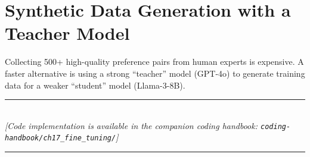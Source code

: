 \section{Synthetic Data Generation with a Teacher Model}

Collecting 500+ high-quality preference pairs from human experts is expensive. A faster alternative is using a strong ``teacher'' model (GPT-4o) to generate training data for a weaker ``student'' model (Llama-3-8B).


\begin{center}
\noindent\rule{0.6\textwidth}{0.4pt} \\
\vspace{0.3em}
\textit{[Code implementation is available in the companion coding handbook: \texttt{coding-handbook/ch17\_fine\_tuning/}]} \\
\noindent\rule{0.6\textwidth}{0.4pt}
\end{center}

